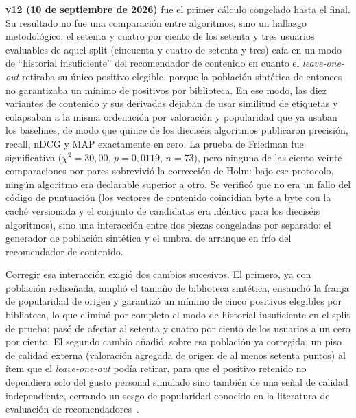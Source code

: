 \textbf{v12 (10 de septiembre de 2026)} fue el primer cálculo congelado hasta el final. Su
resultado no fue una comparación entre algoritmos, sino un hallazgo metodológico: el
setenta y cuatro por ciento de los setenta y tres usuarios evaluables de aquel split
(cincuenta y cuatro de setenta y tres) caía en un modo de \enquote{historial insuficiente} del
recomendador de contenido en cuanto el \emph{leave-one-out} retiraba su único positivo
elegible, porque la población sintética de entonces no garantizaba un mínimo de positivos
por biblioteca. En ese modo, las diez variantes de contenido y sus derivadas dejaban de usar
similitud de etiquetas y colapsaban a la misma ordenación por valoración y popularidad que ya
usaban los baselines, de modo que quince de los dieciséis algoritmos publicaron precisión,
recall, nDCG y MAP exactamente en cero. La prueba de Friedman fue significativa
(\(\chi^2=30{,}00\), \(p=0{,}0119\), \(n=73\)), pero ninguna de las ciento veinte
comparaciones por pares sobrevivió la corrección de Holm: bajo ese protocolo, ningún
algoritmo era declarable superior a otro. Se verificó que no era un fallo del código de
puntuación (los vectores de contenido coincidían byte a byte con la caché versionada y el
conjunto de candidatas era idéntico para los dieciséis algoritmos), sino una interacción entre
dos piezas congeladas por separado: el generador de población sintética y el umbral de
arranque en frío del recomendador de contenido.

Corregir esa interacción exigió dos cambios sucesivos. El primero, ya con población
rediseñada, amplió el tamaño de biblioteca sintética, ensanchó la franja de popularidad de
origen y garantizó un mínimo de cinco positivos elegibles por biblioteca, lo que eliminó por
completo el modo de historial insuficiente en el split de prueba: pasó de afectar al setenta y
cuatro por ciento de los usuarios a un cero por ciento. El segundo cambio añadió, sobre esa
población ya corregida, un piso de calidad externa (valoración agregada de origen de al menos
setenta puntos) al ítem que el \emph{leave-one-out} podía retirar, para que el positivo
retenido no dependiera solo del gusto personal simulado sino también de una señal de calidad
independiente, cerrando un sesgo de popularidad conocido en la literatura de evaluación de
recomendadores~\cite{cremonesi2010performance}.

